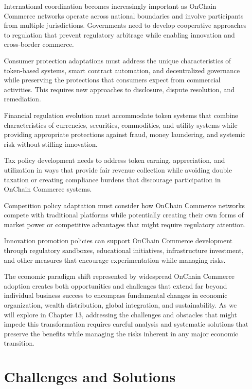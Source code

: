 \documentclass[
  Letterpaper,
]{scrbook}
\begin{document}
International coordination becomes increasingly important as OnChain
Commerce networks operate across national boundaries and involve
participants from multiple jurisdictions. Governments need to develop
cooperative approaches to regulation that prevent regulatory arbitrage
while enabling innovation and cross-border commerce.

Consumer protection adaptations must address the unique characteristics
of token-based systems, smart contract automation, and decentralized
governance while preserving the protections that consumers expect from
commercial activities. This requires new approaches to disclosure,
dispute resolution, and remediation.

Financial regulation evolution must accommodate token systems that
combine characteristics of currencies, securities, commodities, and
utility systems while providing appropriate protections against fraud,
money laundering, and systemic risk without stifling innovation.

Tax policy development needs to address token earning, appreciation, and
utilization in ways that provide fair revenue collection while avoiding
double taxation or creating compliance burdens that discourage
participation in OnChain Commerce systems.

Competition policy adaptation must consider how OnChain Commerce
networks compete with traditional platforms while potentially creating
their own forms of market power or competitive advantages that might
require regulatory attention.

Innovation promotion policies can support OnChain Commerce development
through regulatory sandboxes, educational initiatives, infrastructure
investment, and other measures that encourage experimentation while
managing risks.

The economic paradigm shift represented by widespread OnChain Commerce
adoption creates both opportunities and challenges that extend far
beyond individual business success to encompass fundamental changes in
economic organization, wealth distribution, global integration, and
sustainability. As we will explore in Chapter 13, addressing the
challenges and obstacles that might impede this transformation requires
careful analysis and systematic solutions that preserve the benefits
while managing the risks inherent in any major economic transition.

\chapter{Challenges and Solutions}\label{sec-challenges-solutions}
\end{document}
